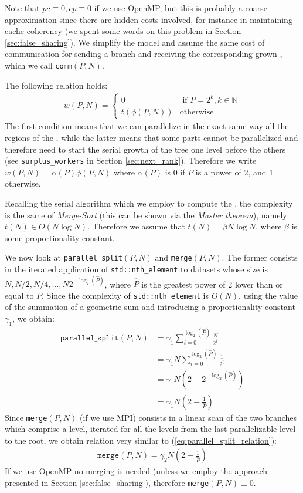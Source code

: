 \documentclass{article}
\begin{document}
Note that $pc \equiv 0, cp \equiv 0$ if we use OpenMP, but this is probably a
coarse approximation since there are hidden costs involved, for instance in
maintaining cache coherency (we spent some words on this problem in Section
\ref{sec:false_sharing}). We simplify the model and assume the same cost of
communication for sending a branch and receiving the corresponding grown
\kdtree{}, which we call \texttt{comm}$(P,N)$.

The following relation holds:
\begin{gather*}
    w(P,N) = \begin{cases}
        0 &\text{ if } P = 2^k, k \in \mathbb{N}\\
        t(\phi(P,N)) &\text{otherwise}
    \end{cases}
\end{gather*}
The first condition means that we can parallelize in the exact same way
all the regions of the \kdtree{}, while the latter means that some parts cannot
be parallelized and therefore need to start the serial growth of the tree one
level before the others (see \texttt{surplus\_workers} in Section
\ref{sec:next_rank}). Therefore we write $w(P,N) = \alpha(P)\phi(P,N)$ where
$\alpha(P)$ is 0 if $P$ is a power of 2, and 1 otherwise.

Recalling the serial algorithm which we employ to compute the \kdtree{}, the
complexity is the same of \emph{Merge-Sort} (this can be shown via the
\emph{Master theorem}), namely $t(N) \in O(N \log N)$. Therefore we assume that
$t(N) = \beta N \log N$, where $\beta$ is some proportionality constant.

We now look at \texttt{parallel\_split}$(P,N)$ and \texttt{merge}$(P,N)$. The
former consists in the iterated application of \texttt{std::nth\_element} to
datasets whose size is $N, N/2, N/4, ..., N2^{-\log_2(\hat{P})}$, where
$\hat{P}$ is the greatest power of 2 lower than or equal to $P$. Since the
complexity of \texttt{std::nth\_element} is $O(N)$, using the value of the
summation of a geometric sum and introducing a proportionality constant
$\gamma_1$, we obtain:
\begin{align} \label{eq:parallel_split_relation}
    \texttt{parallel\_split}(P,N) &= \gamma_1 \sum_{i=0}^{\log_2(\hat{P})} \frac{N}{2^i}\\
    &= \gamma_1 N \sum_{i=0}^{\log_2(\hat{P})} \frac{1}{2^i}\\
    &= \gamma_1 N (2 - 2^{-\log_2(\hat{P})})\\
    &= \gamma_1 N \left(2 - \frac{1}{\hat{P}}\right)
\end{align}
Since \texttt{merge}$(P,N)$ (if we use MPI) consists in a linear scan of the two
branches which comprise a level, iterated for all the levels from the last
parallelizable level to the root, we obtain relation very similar to
(\ref*{eq:parallel_split_relation}):
\begin{gather*}
    \texttt{merge}(P,N) = \gamma_2 N \left(2 - \frac{1}{\hat{P}}\right)
\end{gather*}
If we use OpenMP no merging is needed (unless we employ the approach
presented in Section \ref{sec:false_sharing}), therefore
\texttt{merge}$(P,N) \equiv 0$.
\end{document}
